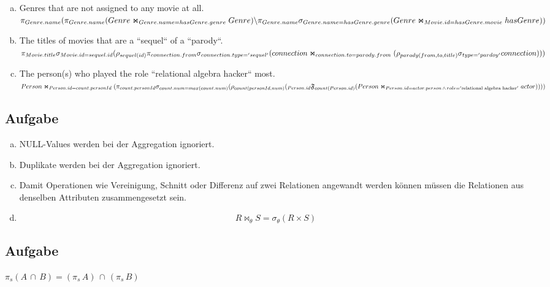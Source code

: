 \documentclass[11pt,a4paper,DIV=9]{scrartcl}
\newcounter{temp}
\newcommand{\aufgabe}[1]{
  \setcounter{temp}{\value{subsection}}
  \setcounter{subsection}{#1}
  \addtocounter{subsection}{-1}
  \subsection{Aufgabe}
  \setcounter{subsection}{\value{temp}}
}
\begin{document}
\begin{enumerate}[a)]
    \item Genres that are not assigned to any movie at all. \hfill \\
      $
      \pi _{Genre.name} \\
      (\pi _{Genre.name}(Genre \Join _{Genre.name = hasGenre.genre} Genre )\\
      \backslash
        \\
        \pi _{Genre.name} \sigma _{Genre.name = hasGenre.genre} (Genre \Join _{Movie.id = hasGenre.movie} hasGenre))
      $
    \item The titles of movies that are a ``sequel`` of a ``parody``. \\
      $\pi_{Movie.title} \\
      \sigma_{Movie.id = sequel.id} \\
      (\rho_{sequel(id)}\\
      \pi_{connection.from}\sigma_{connection.type='sequel'}\\
      (connection \Join_{connection.to = parody.from} \\ 
        (\rho_{parody(from,to,title)}\sigma_{type='pardoy'}connection)\\
      ))$
    \item The person(s) who played the role ``relational algebra hacker`` most.\hfill\\
      $
      Person \Join_{Person.id = count.personId}(\pi_{count.personId}\\
      \sigma_{count.num=max(count.num)}\\
      (
        \rho_{count(personId,num)} (\\
          _{Person.id}\mathfrak{F}_{count(Person.id)}(\\
          Person\Join_{Person.id = actor.person \,\wedge\, role = '\textrm{relational algebra hacker}'}actor\\
          )\\
        )\\
      ))
      $
  \end{enumerate}
\aufgabe{2}
 \begin{enumerate}[a)]
   \item NULL-Values werden bei der Aggregation ignoriert.
   \item Duplikate werden bei der Aggregation ignoriert.
   \item Damit Operationen wie Vereinigung, Schnitt oder Differenz auf zwei Relationen angewandt werden k\"onnen m\"ussen die Relationen aus denselben Attributen zusammengesetzt sein.
   \item \begin{displaymath} R \Join _{\theta} S =  \sigma _{\theta} (R \times S) \end{displaymath}
 \end{enumerate}
\aufgabe{3}
$ \pi _{s} (A\, \cap \, B) = (\pi _{s} \, A)\, \cap \,(\pi _{s}\, B)$
\end{document}
